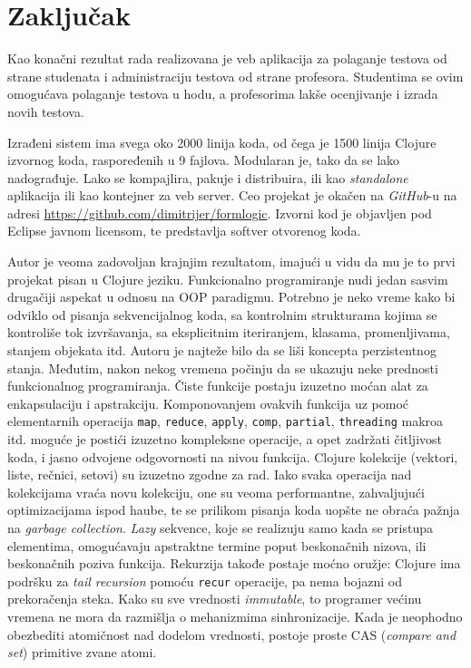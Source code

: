 \chapter{Zaključak}\label{zakljucak}
Kao konačni rezultat rada realizovana je veb aplikacija za polaganje testova od strane studenata i administraciju testova od strane profesora. Studentima se ovim omogućava polaganje testova u hodu, a profesorima lakše ocenjivanje i izrada novih testova.

Izrađeni sistem ima svega oko 2000 linija koda, od čega je 1500 linija Clojure izvornog koda, raspoređenih u 9 fajlova. Modularan je, tako da se lako nadograđuje. Lako se kompajlira, pakuje i distribuira, ili kao \textit{standalone} aplikacija ili kao kontejner za veb server. Ceo projekat je okačen na \textit{GitHub}-u na adresi \url{https://github.com/dimitrijer/formlogic}. Izvorni kod je objavljen pod Eclipse javnom licensom, te predstavlja softver otvorenog koda.

Autor je veoma zadovoljan krajnjim rezultatom, imajući u vidu da mu je to prvi projekat pisan u Clojure jeziku. Funkcionalno programiranje nudi jedan sasvim drugačiji aspekat u odnosu na OOP paradigmu. Potrebno je neko vreme kako bi odviklo od pisanja sekvencijalnog koda, sa kontrolnim strukturama kojima se kontroliše tok izvršavanja, sa eksplicitnim iteriranjem, klasama, promenljivama, stanjem objekata itd. Autoru je najteže bilo da se liši koncepta perzistentnog stanja. Međutim, nakon nekog vremena počinju da se ukazuju neke prednosti funkcionalnog programiranja. Čiste funkcije postaju izuzetno moćan alat za enkapsulaciju i apstrakciju. Komponovanjem ovakvih funkcija uz pomoć elementarnih operacija \texttt{map}, \texttt{reduce}, \texttt{apply}, \texttt{comp}, \texttt{partial}, \texttt{threading} makroa itd. moguće je postići izuzetno kompleksne operacije, a opet zadržati čitljivost koda, i jasno odvojene odgovornosti na nivou funkcija. Clojure kolekcije (vektori, liste, rečnici, setovi) su izuzetno zgodne za rad. Iako svaka operacija nad kolekcijama vraća novu kolekciju, one su veoma performantne, zahvaljujući optimizacijama ispod haube, te se prilikom pisanja koda uopšte ne obraća pažnja na \textit{garbage collection}. \textit{Lazy} sekvence, koje se realizuju samo kada se pristupa elementima, omogućavaju apstraktne termine poput beskonačnih nizova, ili beskonačnih poziva funkcija. Rekurzija takođe postaje moćno oružje: Clojure ima podršku za \textit{tail recursion} pomoću \texttt{recur} operacije, pa nema bojazni od prekoračenja steka. Kako su sve vrednosti \textit{immutable}, to programer većinu vremena ne mora da razmišlja o mehanizmima sinhronizacije. Kada je neophodno obezbediti atomičnost nad dodelom vrednosti, postoje proste CAS (\textit{compare and set}) primitive zvane atomi.

